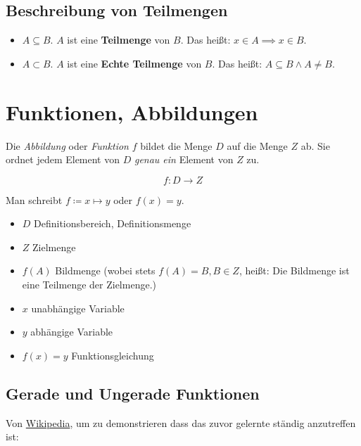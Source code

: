 \subsection{Beschreibung von Teilmengen}
\begin{itemize}
    \item $A\subseteq B$. $A$ ist eine \textbf{Teilmenge} von $B$. Das heißt: $x \in A \implies x \in B$.
    \item $A\subset B$. $A$ ist eine \textbf{Echte Teilmenge} von $B$. Das heißt: $A\subseteq B \land A \neq B $.
\end{itemize}


\section{Funktionen, Abbildungen}
\label{sec:funktionen}

Die \emph{Abbildung} oder \emph{Funktion} $f$ bildet die Menge $D$ auf die Menge $Z$ ab. Sie ordnet jedem Element von $D$ \emph{genau ein} Element von $Z$ zu.

    $$ f : D \to Z$$

Man schreibt $f\coloneqq x \mapsto y$ oder $f(x) = y$.

\begin{itemize}
    \item $D$ Definitionsbereich, Definitionsmenge
    \item $Z$ Zielmenge
    \item $f(A)$ Bildmenge (wobei stets $f(A)=B, B \in Z$, heißt: Die Bildmenge ist eine Teilmenge der Zielmenge.)
    \item $x$ unabhängige Variable
    \item $y$ abhängige Variable
    \item $f(x) = y$ Funktionsgleichung
\end{itemize}



\subsection{Gerade und Ungerade Funktionen}\label{subsec:geradeUngerade}
Von \href{https://de.wikipedia.org/wiki/Gerade\_und\_ungerade\_Funktionen}{Wikipedia}, um zu demonstrieren dass das zuvor gelernte ständig anzutreffen ist:

